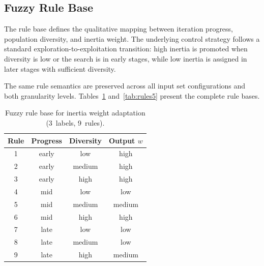 \subsection{Fuzzy Rule Base}
\label{subsec:rule_base}

The rule base defines the qualitative mapping between iteration progress, population diversity, and inertia weight. The underlying control strategy follows a standard exploration-to-exploitation transition: high inertia is promoted when diversity is low or the search is in early stages, while low inertia is assigned in later stages with sufficient diversity.

The same rule semantics are preserved across all input set configurations and both granularity levels. Tables~\ref{tab:rules3} and~\ref{tab:rules5} present the complete rule bases.

\begin{table}[htbp]
\caption{Fuzzy rule base for inertia weight adaptation (3~labels, 9~rules).}
\label{tab:rules3}
\centering
\begin{tabular}{@{}cccc@{}}
\toprule
Rule & Progress & Diversity & Output $w$ \\ \midrule
1    & early    & low       & high   \\
2    & early    & medium    & high   \\
3    & early    & high      & high   \\ \midrule
4    & mid      & low       & low    \\
5    & mid      & medium    & medium \\
6    & mid      & high      & high   \\ \midrule
7    & late     & low       & low    \\
8    & late     & medium    & low    \\
9    & late     & high      & medium \\ \bottomrule
\end{tabular}
\end{table}

